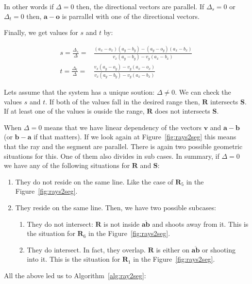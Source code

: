 In other words if $\Delta = 0$ then, the directional vectors are parallel.
If $\Delta_s =  0$ or $\Delta_t = 0$ then, $\mathbf{a} - \mathbf{o}$ is parrallel with one of the directional vectors.

Finally, we get values for $s$ and $t$ by:

\begin{align*}
s = \frac{\Delta_s}{\Delta} =&  \frac{(a_x - o_x)(a_y - b_y) - (a_y - o_y)(a_x - b_x)}{v_x(a_y - b_y) - v_y(a_x - b_x)} \\
t = \frac{\Delta_t}{\Delta} =&  \frac{v_x(a_y - o_y) - v_y(a_x - o_x)}{v_x(a_y - b_y) - v_y(a_x - b_x)}
\end{align*}

Lets assume that the system has a unique soution: $\Delta \neq 0$. We can check the values $s$ and $t$. If both of the values fall in the desired range then, $\mathbf{R}$ intersects $\mathbf{S}$. If at least one of the values is ouside the range, $\mathbf{R}$ does not intersects $\mathbf{S}$.

When $\Delta = 0$ means that we have linear dependency of the vectors $\mathbf{v}$ and $\mathbf{a} - \mathbf{b}$ (or $\mathbf{b} - \mathbf{a}$ if that matters).
If we look again at Figure~\ref{fig:rays2seg} this means that the ray and the segment are parallel.
There is again two possible geometric situations for this. One of them also divides in sub cases.
In summary, if $\Delta = 0$ we have any of the following situations for $\mathbf{R}$ and $\mathbf{S}$:
\begin{enumerate}
  \item They do not reside on the same line. Like the case of $\mathbf{R}_5$ in the Figure~\ref{fig:rays2seg}.
  \item They reside on the same line. Then, we have two possible subcases:
  \begin{enumerate}
    \item They do not intersect: $\mathbf{R}$ is not inside $\overline{\mathbf{a}\mathbf{b}}$ and shoots away from it. This is the situation for $\mathbf{R}_6$ in the Figure~\ref{fig:rays2seg}.
    \item They do intersect. In fact, they overlap. $\mathbf{R}$ is either on $\overline{\mathbf{a}\mathbf{b}}$ or shooting into it. This is the situation for $\mathbf{R}_1$ in the Figure~\ref{fig:rays2seg}.
  \end{enumerate}
\end{enumerate}

All the above led us to Algorithm~\ref{alg:ray2seg}:

